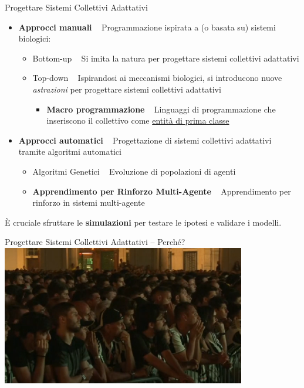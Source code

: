 \documentclass[presentation, 10pt,aspectratio=169]{beamer}\mode<presentation>{\usetheme{AMSBolognaFC}}
\begin{document}
\begin{frame}{Progettare Sistemi Collettivi Adattativi}
	\begin{itemize}
		\item \textbf{Approcci manuali} \faArrowRight ~ Programmazione ispirata a (o basata su) sistemi biologici:
		\begin{itemize}
			\item \alert{Bottom-up} \faArrowRight ~ Si imita la natura per progettare sistemi collettivi adattativi
			\item \alert{Top-down} \faArrowRight ~ Ispirandosi ai meccanismi biologici, si introducono nuove \emph{astrazioni} per progettare sistemi collettivi adattativi
			\begin{itemize}
				\item \textbf{Macro programmazione} \faArrowRight ~ Linguaggi di programmazione che inseriscono il collettivo come \underline{entità di prima classe}
			\end{itemize}
		\end{itemize}
		\item \textbf{Approcci automatici} \faArrowRight ~ Progettazione di sistemi collettivi adattativi tramite algoritmi automatici
		\begin{itemize}
			\item \alert{Algoritmi Genetici} \faArrowRight ~ Evoluzione di popolazioni di agenti
			\item \textbf{Apprendimento per Rinforzo Multi-Agente} \faArrowRight ~ Apprendimento per rinforzo in sistemi multi-agente
		\end{itemize}
	\end{itemize}

	È cruciale sfruttare le \alert{\textbf{simulazioni}} per testare le ipotesi e validare i modelli.
\end{frame}
\begin{frame}{Progettare Sistemi Collettivi Adattativi -- Perché?}
	\centering
	\href{https://www.youtube.com/watch?v=P0BTSKuCAOM}{
	\includegraphics[width=0.8\textwidth]{img/turin-stampede.png}
	}
\end{frame}
\end{document}
